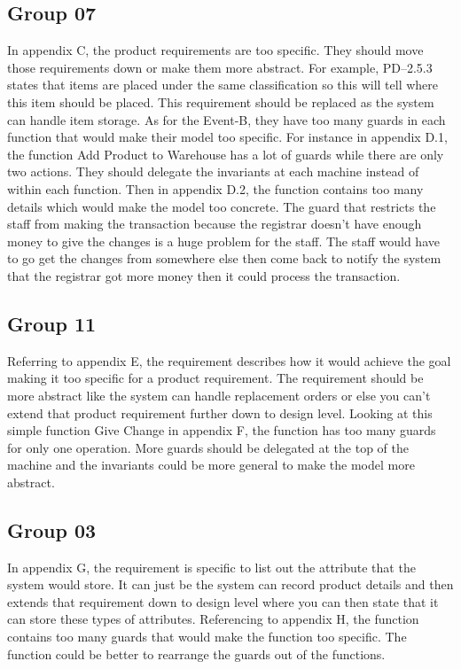 \subsection{Group 07}
\label{group07}

In appendix C, the product requirements are too specific. They should move those requirements down or make them more abstract. For example, PD--2.5.3 states that items are placed under the same classification so this will tell where this item should be placed. This requirement should be replaced as the system can handle item storage. As for the Event-B, they have too many guards in each function that would make their model too specific. For instance in appendix D.1, the function Add Product to Warehouse has a lot of guards while there are only two actions. They should delegate the invariants at each machine instead of within each function. Then in appendix D.2, the function contains too many details which would make the model too concrete. The guard that restricts the staff from making the transaction because the registrar doesn’t have enough money to give the changes is a huge problem for the staff. The staff would have to go get the changes from somewhere else then come back to notify the system that the registrar got more money then it could process the transaction.

\subsection{Group 11}
\label{group11}

Referring to appendix E, the requirement describes how it would achieve the goal making it too specific for a product requirement. The requirement should be more abstract like the system can handle replacement orders or else you can’t extend that product requirement further down to design level. Looking at this simple function Give Change in appendix F, the function has too many guards for only one operation. More guards should be delegated at the top of the machine and the invariants could be more general to make the model more abstract.

\subsection{Group 03}
\label{group03}

In appendix G, the requirement is specific to list out the attribute that the system would store. It can just be the system can record product details and then extends that requirement down to design level where you can then state that it can store these types of attributes. Referencing to appendix H, the function contains too many guards that would make the function too specific. The function could be better to rearrange the guards out of the functions. 

